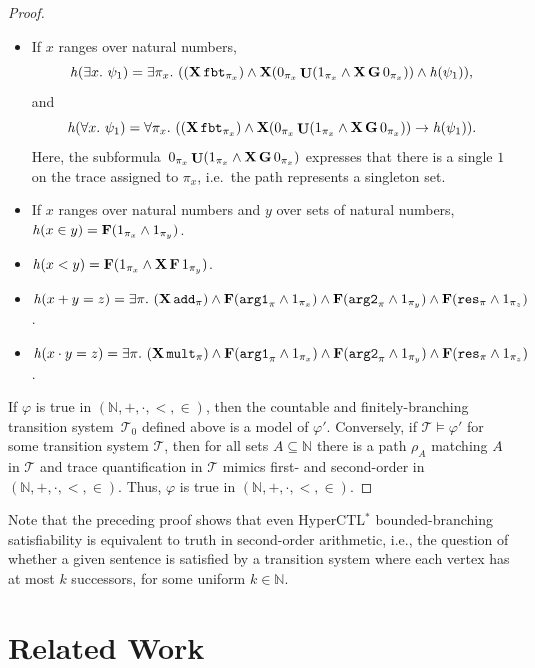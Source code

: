\documentclass[dvipsnames,10pt,a4paper]{amsart}
\theoremstyle{definition}
\theoremstyle{remark}
\newcommand{\nats}{\mathbb{N}}
\newcommand\Nat{\nats}
\newcommand{\tsys}{\mathcal{T}}
\newcommand{\F}{\mathop{\mathbf{F}\vphantom{a}}\nolimits}
\newcommand{\G}{\mathop{\mathbf{G}\vphantom{a}}\nolimits}
\DeclareMathOperator{\U}{\mathbf{U}}
\newcommand{\X}{\mathop{\mathbf{X}\vphantom{a}}\nolimits}
\newcommand{\hyctlstar}{{HyperCTL$^*$}\xspace}
\newcommand\argl{\textup{\texttt{arg1}}}
\newcommand\argr{\textup{\texttt{arg2}}}
\newcommand\res{\textup{\texttt{res}}}
\newcommand\add{\textup{\texttt{add}}}
\newcommand\mult{\textup{\texttt{mult}}}
\newcommand\fbt{\textup{\texttt{fbt}}}
\newcommand\xo{x}
\newcommand\yo{y}
\newcommand\zo{z}
\newcommand\yt{y}
\newcommand\pix[1]{\pi_{#1}}
\newcommand\tr [1]{\mathit{h}(#1)}
\newcommand\tsysc{\tsys_0}
\begin{document}
\begin{proof}
\begin{itemize}
  \item If $x$ ranges over natural numbers, 
    \[\tr {\exists x.\ \psi_1} = \exists \pix x.\ ((\X \fbt_{\pix x}) \land
    \X (0_{\pix x} \U (1_{\pix x} \land \X\G 0_{\pix x})) \land \tr  {\psi_1}),\]
    and
    \[\tr {\forall x.\ \psi_1} = \forall \pix x.\ ((\X \fbt_{\pix x}) \land
    \X (0_{\pix x} \U (1_{\pix x} \land \X\G 0_{\pix x})) \rightarrow \tr  {\psi_1}).\] 
    Here, the subformula~$0_{\pix x} \U (1_{\pix x} \land \X\G 0_{\pix x})$ expresses that there is a single $1$ on the trace assigned to $\pix x$, i.e.\ the path represents a singleton set.
  \item If $\xo$ ranges over natural numbers and $\yt$ over sets of natural
    numbers, $\tr {\xo \in \yt} = \F(1_{\pix \xo} \land 1_{\pix \yt})$.
  \item $\tr {\xo < \yo} = \F(1_{\pix \xo} \land \X \F 1_{\pix \yo})$.
  \item $\tr {\xo + \yo = \zo} = \exists \pi.\ (\X \add_\pi) \land \F(\argl_\pi \land 1_{\pix \xo}) \land
    \F(\argr_{\pi} \land 1_{\pix \yo}) \land \F(\res_\pi \land 1_{\pix \zo})$.
   \item  $\tr {\xo\cdot\yo = \zo} =
    \exists \pi.\ (\X \mult_\pi) \land \F(\argl_\pi \land 1_{\pix \xo}) \land
    \F(\argr_{\pi} \land 1_{\pix \yo}) \land \F(\res_\pi \land 1_{\pix \zo})$.
  \end{itemize}

  If $\varphi$ is true in $(\Nat, +, \cdot, <,\in)$,
  then the countable and finitely-branching transition system~$\tsysc$ defined above is a model of $\varphi'$.
  Conversely, if $\tsys \models \varphi'$ for some transition system $\tsys$,
  then for all sets $A \subseteq \Nat$ there is a path $\rho_A$ matching $A$ in $\tsys$ and trace quantification in $\tsys$ mimics first- and second-order in $(\Nat, +, \cdot, <,\in)$.
  Thus, $\varphi$ is true in $(\Nat, +, \cdot, <,\in)$.
\end{proof}


Note that the preceding proof shows that even \hyctlstar bounded-branching satisfiability is equivalent to truth in second-order arithmetic, i.e., the question of whether a given sentence is satisfied by a transition system where each vertex has at most $k$ successors, for some uniform $k \in \nats$.



\section{Related Work}
\label{sec:relatedwork}
\end{document}
